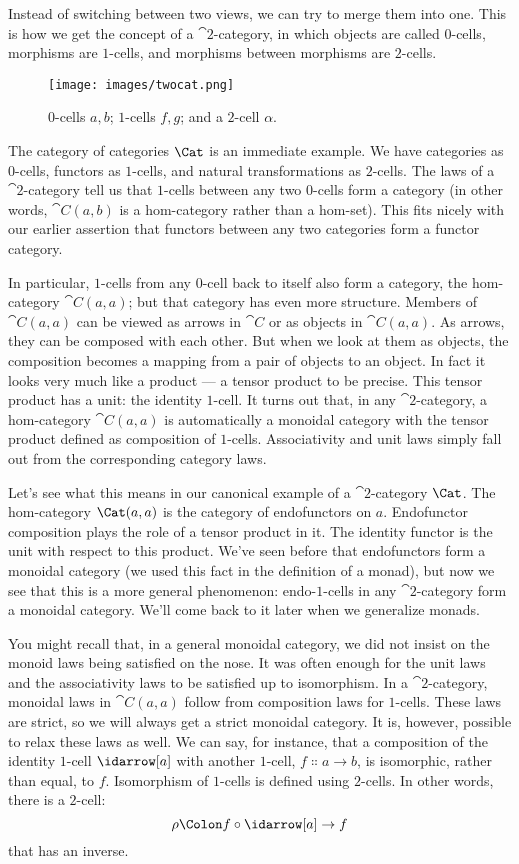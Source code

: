 Instead of switching between two views, we can try to merge them into
one. This is how we get the concept of a $\cat{2}$-category, in which objects
are called $0$-cells, morphisms are $1$-cells, and morphisms between
morphisms are $2$-cells.

\begin{figure}[H]
\centering
\texttt{[image: images/twocat.png]}
\caption{$0$-cells $a, b$; $1$-cells $f, g$; and a $2$-cell $\alpha$.}
\end{figure}

\noindent
The category of categories $\Cat$ is an immediate example. We have
categories as $0$-cells, functors as $1$-cells, and natural transformations
as $2$-cells. The laws of a $\cat{2}$-category tell us that $1$-cells between any
two $0$-cells form a category (in other words, $\cat{C}(a, b)$ is a
hom-category rather than a hom-set). This fits nicely with our earlier
assertion that functors between any two categories form a functor
category.

In particular, $1$-cells from any $0$-cell back to itself also form a
category, the hom-category $\cat{C}(a, a)$; but that category has even
more structure. Members of $\cat{C}(a, a)$ can be viewed as arrows in
$\cat{C}$ or as objects in $\cat{C}(a, a)$. As arrows, they can be
composed with each other. But when we look at them as objects, the
composition becomes a mapping from a pair of objects to an object. In
fact it looks very much like a product --- a tensor product to be
precise. This tensor product has a unit: the identity $1$-cell. It turns
out that, in any $\cat{2}$-category, a hom-category $\cat{C}(a, a)$ is
automatically a monoidal category with the tensor product defined as
composition of $1$-cells. Associativity and unit laws simply fall out from
the corresponding category laws.

Let's see what this means in our canonical example of a $\cat{2}$-category
$\Cat$. The hom-category $\Cat(a, a)$ is the category of
endofunctors on $a$. Endofunctor composition plays the role of a
tensor product in it. The identity functor is the unit with respect to
this product. We've seen before that endofunctors form a monoidal
category (we used this fact in the definition of a monad), but now we
see that this is a more general phenomenon: endo-$1$-cells in any
$\cat{2}$-category form a monoidal category. We'll come back to it later when we
generalize monads.

You might recall that, in a general monoidal category, we did not insist
on the monoid laws being satisfied on the nose. It was often enough for
the unit laws and the associativity laws to be satisfied up to
isomorphism. In a $\cat{2}$-category, monoidal laws in $\cat{C}(a, a)$ follow
from composition laws for $1$-cells. These laws are strict, so we will
always get a strict monoidal category. It is, however, possible to relax
these laws as well. We can say, for instance, that a composition of the
identity $1$-cell $\idarrow[a]$ with another $1$-cell,
$f \Colon a \to b$, is isomorphic, rather than equal,
to $f$. Isomorphism of $1$-cells is defined using $2$-cells. In other
words, there is a $2$-cell:
\[\rho \Colon f \circ \idarrow[a] \to f\]
that has an inverse.

